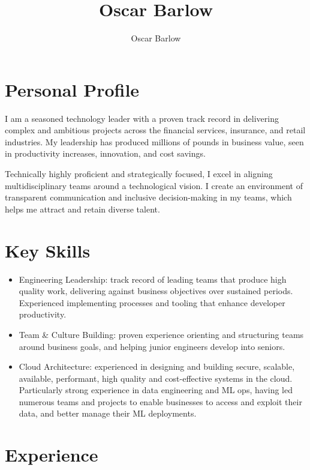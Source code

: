 \documentclass[a4paper]{scrartcl}
\author{Oscar Barlow}
\title{Oscar Barlow}
\date{}
\begin{document}
\maketitle


\section*{Personal Profile}
 { %
  \setlength{\parskip}{6pt plus 2pt minus 1pt}
  I am a seasoned technology leader with a proven track record in
  delivering complex and ambitious projects across the financial services,
  insurance,
  and retail industries. My leadership has produced
  millions of pounds in business value, seen in
  productivity increases, innovation, and cost savings.

  Technically highly proficient and strategically focused, I excel in aligning
  multidisciplinary
  teams around a technological vision. I create an environment of
  transparent communication and inclusive decision-making in my teams, which helps me attract and retain diverse talent.
 } %

\section*{Key Skills}
\begin{itemize}
	\item Engineering Leadership: track record of leading teams that produce high quality work, delivering against business objectives over sustained periods. Experienced implementing processes and tooling that enhance developer productivity.
	\item Team \& Culture Building: proven experience orienting and structuring teams around business goals, and helping junior engineers develop into seniors.
	\item Cloud Architecture: experienced in designing and building secure,
	      scalable, available, performant, high quality and cost-effective
	      systems in the
	      cloud. Particularly strong experience in data engineering and ML ops, having led numerous teams and projects to enable businesses to access and exploit their data, and better manage their ML deployments.
\end{itemize}

\section*{Experience}
\end{document}
